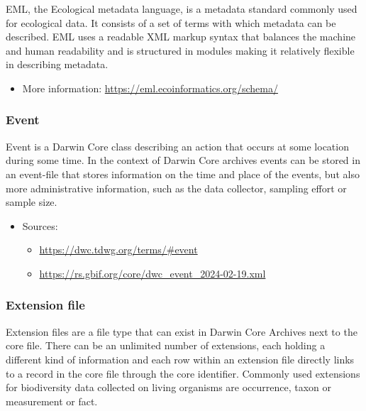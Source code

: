 \documentclass[
  oneside]{book}
\providecommand{\tightlist}{%
  \setlength{\itemsep}{0pt}\setlength{\parskip}{0pt}}
\begin{document}
EML, the Ecological metadata language, is a metadata standard commonly used for ecological data. It consists of a set of terms with which metadata can be described. EML uses a readable XML markup syntax that balances the machine and human readability and is structured in modules making it relatively flexible in describing metadata.

\begin{itemize}
\tightlist
\item
  More information: \url{https://eml.ecoinformatics.org/schema/}
\end{itemize}

\subsubsection*{Event}\label{event}

Event is a Darwin Core class describing an action that occurs at some location during some time. In the context of Darwin Core archives events can be stored in an event-file that stores information on the time and place of the events, but also more administrative information, such as the data collector, sampling effort or sample size.

\begin{itemize}
\tightlist
\item
  Sources:

  \begin{itemize}
  \tightlist
  \item
    \url{https://dwc.tdwg.org/terms/\#event}
  \item
    \url{https://rs.gbif.org/core/dwc_event_2024-02-19.xml}
  \end{itemize}
\end{itemize}

\subsubsection*{Extension file}\label{extension}

Extension files are a file type that can exist in Darwin Core Archives next to the core file. There can be an unlimited number of extensions, each holding a different kind of information and each row within an extension file directly links to a record in the core file through the core identifier. Commonly used extensions for biodiversity data collected on living organisms are occurrence, taxon or measurement or fact.
\end{document}
